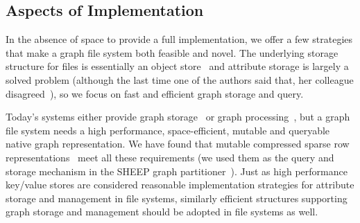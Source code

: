 \begin{comment}
Our edges are labeled, weighted directional edges in a hypergraph: each label consists of a \textit{relationship} and a \textit{weight}.  Because our
goal is not to strictly restrict the relationships, we suggest that a relationship itself consists of a \textit{domain} identifying how to interpret
the relationship (presumably by agreement for those creating those relationships) and a domain-specific \textit{relationship-label}.  We can define
a set of relationships that we will initially support: \textit{contains}, \textit{is contained by}, \textit{is related to}, etc.

Thus, we now have enough structure for us to create a mapping from the existing POSIX file system interface, including its hierarchical name structure
to be compatible with existing systems. 
\end{comment}

\subsection{Aspects of Implementation}

In the absence of space to provide a full implementation, we offer a few
strategies that make a graph file system both feasible and novel.
The underlying storage structure for files is essentially an object store~\cite{factor2005object} and
attribute storage is largely a solved problem
(although the last time
one of the authors said that, her colleague disagreed~\cite{mao2012cache}), so we
focus on fast and efficient graph storage and query.

Today's systems either provide graph storage~\cite{rudolf2013graph,webber2018programmatic,microsoft:cosmosdb} 
or graph processing~\cite{shun2013ligra,gonzalez2014graphx,malewicz2010pregel,salihoglu2013gps,nguyen2013lightweight,low2014graphlab,kyrola2012graphchi}, 
but a graph file system needs a high performance, space-efficient, mutable and queryable
native graph representation.
We have found that mutable compressed sparse row representations~\cite{macko2015llama}
meet all these requirements (we used them as the query and storage mechanism in the
SHEEP graph partitioner~\cite{margo2015scalable}).
Just as high performance key/value stores are considered reasonable implementation
strategies for attribute storage and management in file systems, similarly efficient
structures supporting graph storage and management should be adopted in file systems
as well.
